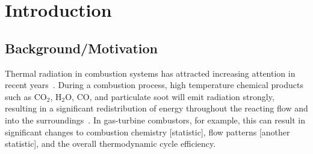 \addchapheadtotoc

\chapter{Introduction} \label{chapter:Introduction}

\section{Background/Motivation}
Thermal radiation in combustion systems has attracted increasing attention in recent years~\cite{Liu2020TheFlames}.
During a combustion process, high temperature chemical products such as CO$_2$, H$_2$O, CO, and particulate soot will emit radiation strongly, resulting in a significant redistribution of energy throughout the reacting flow and into the surroundings~\cite{Modest2022ChapterSystems}. In gas-turbine combustors, for example, this can result in significant changes to combustion chemistry [statistic], flow patterns [another statistic], and the overall thermodynamic cycle efficiency.

